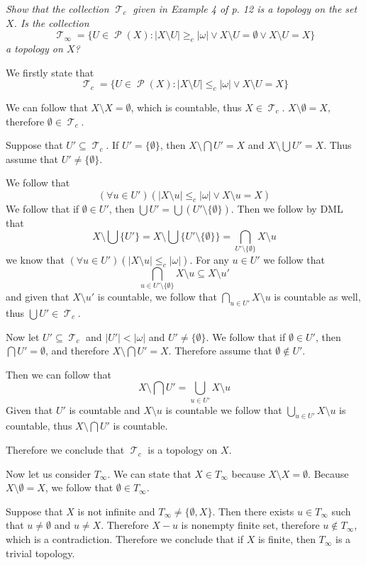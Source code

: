 \documentclass[11pt,oneside,titlepage]{book}
\DeclareMathOperator \pow {\mathcal {P}}
\DeclareMathOperator \topol {\mathcal {T}}
\begin{document}
\textit{Show that the collection $\topol_c$ given in Example 4 of p. 12 is a topology on the
  set $X$. Is the collection
  $$\topol_\infty = \{U \in \pow(X):
  |X \setminus U| \geq_c |\omega| \lor X \setminus U = \emptyset \lor
  X \setminus U = X\}$$
  a topology on $X$?
}

We firstly state that
$$\topol_c = \{U \in \pow(X): |X \setminus U| \leq_c |\omega| \lor X \setminus U = X\}$$

We can follow that $X \setminus X = \emptyset$, which is countable, thus $X \in \topol_c$.
$X \setminus \emptyset = X$, therefore $\emptyset \in \topol_c$.

Suppose that $U' \subseteq \topol_c$. If $U' = \{\emptyset\}$, then $
X \setminus \bigcap{U'} = X$ and $X \setminus \bigcup{U'} = X$.
Thus assume that $U' \neq \{\emptyset\}$.

We follow that
$$(\forall u \in U')(|X \setminus u| \leq_c |\omega| \lor X \setminus u = X)$$
We follow that if $\emptyset \in U'$, then $\bigcup{U'} = \bigcup{(U' \setminus \{\emptyset\})}$.
Then we follow by DML that
$$X \setminus \bigcup\{U'\} = X \setminus \bigcup\{U' \setminus \{\emptyset\}\} =
\bigcap_{U' \setminus \{\emptyset\}}{X \setminus u}$$
we know that $(\forall u \in U')(|X \setminus u| \leq_c |\omega|)$. For any $u \in U'$ we
follow that
$$\bigcap_{u \in U' \setminus \{\emptyset\}}{X \setminus u} \subseteq X \setminus u'$$
and given that $X \setminus u'$ is countable, we follow that $\bigcap_{u \in U'}{X \setminus u}$
is countable as well, thus $\bigcup{U'} \in \topol_c$.

Now let $U' \subseteq \topol_c$ and $|U'| < |\omega|$ and $U' \neq \{\emptyset\}$.
We follow that if $\emptyset \in U'$, then $\bigcap{U'} = \emptyset$, and therefore
$X \setminus \bigcap{U'} = X$. Therefore assume that $\emptyset \notin U'$.

Then we can follow that
$$X \setminus \bigcap{U'} = \bigcup_{u \in U'}{X \setminus u}$$
Given that $U'$ is countable and $X \setminus u$ is countable we follow that
$\bigcup_{u \in U'}{X \setminus u}$ is countable, thus $X \setminus \bigcap{U'}$ is countable.

Therefore we conclude that $\topol_c$ is a topology on $X$.

Now let us consider $T_\infty$. We can state that $X \in T_\infty$ because
$X \setminus X = \emptyset$. Because $X \setminus \emptyset = X$, we follow that
$\emptyset \in T_\infty$.

Suppose that $X$ is not infinite and $T_\infty \neq \{\emptyset, X\}$. Then there exists
$u \in T_\infty$ such that $u \neq \emptyset$ and $u \neq X$. Therefore $X - u$ is
nonempty finite set, therefore $u \notin T_\infty$, which is a contradiction.
Therefore we conclude that if $X$ is finite, then $T_\infty$ is a trivial topology.
\end{document}
